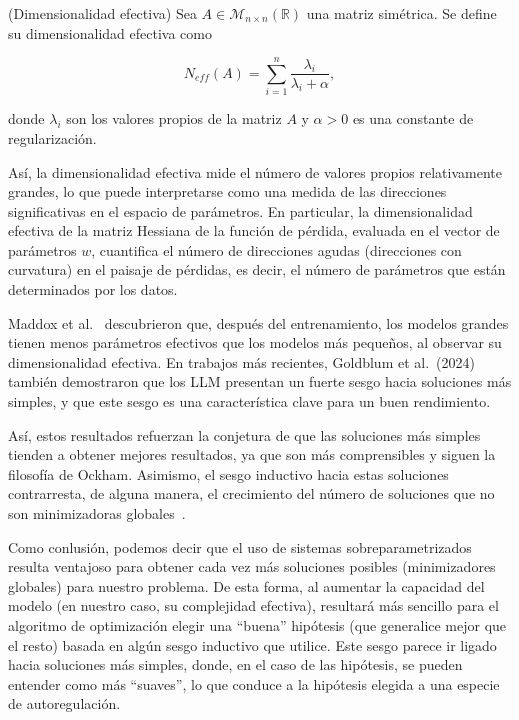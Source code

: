 \begin{definicion}(Dimensionalidad efectiva)
    Sea $A \in \mathcal{M}_{n \times n}(\mathbb{R})$ una matriz simétrica. Se define su dimensionalidad efectiva como

    \[
        N_{eff}(A) = \sum_{i=1}^{n}\frac{\lambda_i}{\lambda_i + \alpha},
    \]

    donde $\lambda_i$ son los valores propios de la matriz $A$ y $\alpha > 0$ es una constante de regularización.
\end{definicion}

Así, la dimensionalidad efectiva mide el número de valores propios relativamente grandes, lo que puede interpretarse como una medida de las direcciones significativas en el espacio de parámetros. En particular, la dimensionalidad efectiva de la matriz Hessiana de la función de pérdida, evaluada en el vector de parámetros $w$, cuantifica el número de direcciones agudas (direcciones con curvatura) en el paisaje de pérdidas, es decir, el número de parámetros que están determinados por los datos.\newline

Maddox et al.~\cite{Maddox2020} descubrieron que, después del entrenamiento, los modelos grandes tienen menos parámetros efectivos que los modelos más pequeños, al observar su dimensionalidad efectiva. En trabajos más recientes, Goldblum et al.~(2024)~\cite{Goldblum2024} también demostraron que los LLM presentan un fuerte sesgo hacia soluciones más simples, y que este sesgo es una característica clave para un buen rendimiento.\newline

Así, estos resultados refuerzan la conjetura de que las soluciones más simples tienden a obtener mejores resultados, ya que son más comprensibles y siguen la filosofía de Ockham. Asimismo, el sesgo inductivo hacia estas soluciones contrarresta, de alguna manera, el crecimiento del número de soluciones que no son minimizadoras globales~\cite{Mingard2023}.\newline

Como conlusión, podemos decir que el uso de sistemas sobreparametrizados resulta ventajoso para obtener cada vez más soluciones posibles (minimizadores globales) para nuestro problema. De esta forma, al aumentar la capacidad del modelo (en nuestro caso, su complejidad efectiva), resultará más sencillo para el algoritmo de optimización elegir una ``buena'' hipótesis (que generalice mejor que el resto) basada en algún sesgo inductivo que utilice. Este sesgo parece ir ligado hacia soluciones más simples, donde, en el caso de las hipótesis, se pueden entender como más ``suaves'', lo que conduce a la hipótesis elegida a una especie de autoregulación.\newline

